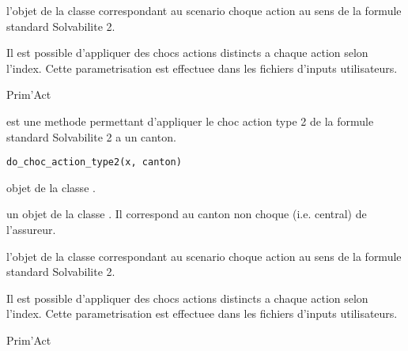 \documentclass[a4paper]{book}
\begin{document}
%
\begin{Value}
 l'objet  de la classe  correspondant au scenario choque action
au sens de la formule standard Solvabilite 2.
\end{Value}
%
\begin{Note}\relax
Il est possible d'appliquer des chocs actions distincts a chaque action selon l'index.
Cette parametrisation est effectuee dans les fichiers d'inputs utilisateurs.
\end{Note}
%
\begin{Author}\relax
Prim'Act
\end{Author}
%
\begin{Description}\relax
{} est une  methode permettant d'appliquer le choc action type 2 de la formule
standard Solvabilite 2 a un canton.
\end{Description}
%
\begin{Usage}
\begin{verbatim}
do_choc_action_type2(x, canton)
\end{verbatim}
\end{Usage}
%
\begin{Arguments}
\begin{ldescription}
\item[\code{x}] objet de la classe .

\item[\code{canton}] un objet de la classe . Il correspond au canton non choque (i.e. central) de l'assureur.
\end{ldescription}
\end{Arguments}
%
\begin{Value}
 l'objet  de la classe  correspondant au scenario choque action 
au sens de la formule standard Solvabilite 2.
\end{Value}
%
\begin{Note}\relax
Il est possible d'appliquer des chocs actions distincts a chaque action selon l'index.
Cette parametrisation est effectuee dans les fichiers d'inputs utilisateurs.
\end{Note}
%
\begin{Author}\relax
Prim'Act
\end{Author}
\end{document}
